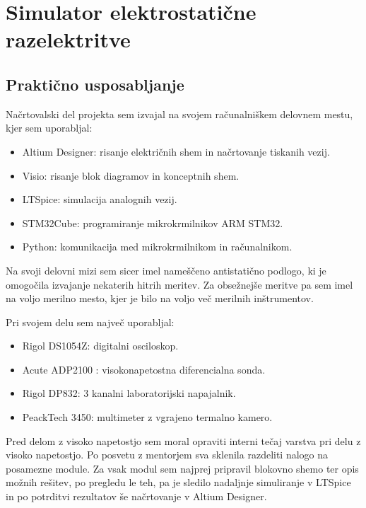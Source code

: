 \documentclass[a4paper,twoside,openright,12pt,Slovene]{book}
\begin{document}
\chapter{Simulator elektrostatične razelektritve} \label{ESDSIM}

	\section{Praktično usposabljanje}
	Načrtovalski del projekta sem izvajal na svojem računalniškem delovnem mestu, kjer sem uporabljal:
	\begin{itemize}
		\item Altium Designer: risanje električnih shem in načrtovanje tiskanih vezij.
		\item Visio: risanje blok diagramov in konceptnih shem.
		\item LTSpice: simulacija analognih vezij.
		\item STM32Cube: programiranje mikrokrmilnikov ARM STM32.
		\item Python: komunikacija med mikrokrmilnikom in računalnikom.
	\end{itemize}
	Na svoji delovni mizi sem sicer imel nameščeno antistatično podlogo, ki je omogočila izvajanje nekaterih hitrih meritev. Za obsežnejše meritve pa sem imel na voljo merilno mesto, kjer je bilo na voljo več merilnih inštrumentov. 
	
	Pri svojem delu sem največ uporabljal:
	\begin{itemize}
		\item Rigol DS1054Z: digitalni osciloskop.
		\item Acute ADP2100 : visokonapetostna diferencialna sonda.
		\item Rigol DP832: 3 kanalni laboratorijski napajalnik.
		\item PeackTech 3450: multimeter z vgrajeno termalno kamero.
	\end{itemize}
	Pred delom z visoko napetostjo sem moral opraviti interni tečaj varstva pri delu z visoko napetostjo. Po posvetu z mentorjem sva sklenila razdeliti nalogo na posamezne module. Za vsak modul sem najprej pripravil blokovno shemo ter opis možnih rešitev, po pregledu le teh, pa je sledilo nadaljnje simuliranje v LTSpice in po potrditvi rezultatov še načrtovanje v Altium Designer.
	
\end{document}
